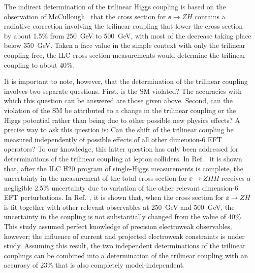The indirect determination of the trilinear Higgs coupling is based on
the observation of McCullough~\cite{McCullough:2013rea} that the cross
section for $\ee\to ZH$ contains a radiative correction involving the
trilinear coupling that lower the cross section by about 1.5\% from
250~GeV to 500~GeV, with most of the decrease taking place below
350~GeV.  Taken a face value in the simple context with only the
trilinear coupling free, the ILC cross section measurements would determine the trilinear 
coupling to about 40\%.

It is important to note, however, that the determination of the
trilinear coupling involves two separate questions.  First, is the SM
violated?   The accuracies with which this question can be answered
are those given above.  Second, can the violation of the SM be
attributed to a change in the trilinear coupling or the Higgs
potential rather than being due to other possible new physics
effects?  A precise way to ask this question is: Can the shift of the
trilinear coupling be measured  independently of possible effects of
all 
other dimension-6 EFT operators?   To our knowledge, this latter
question has only been addressed for determinations of the trilinear
coupling at lepton colliders.   In Ref.~\cite{Barklow:2017awn} it is
shown that, after the ILC H20 program of single-Higgs measurements is
complete, the uncertainty in the measurement of the total cross
section for  $\ee\to ZHH$ receives a negligible 2.5\% uncertainty due
to variation of the other relevant dimension-6 EFT perturbations.   In
Ref.~\cite{DiVita:2017vrr}, it is shown that, when the cross section
for $\ee\to ZH$ is fit together with other relevant observables at
250~GeV and 500~GeV, the
uncertainty in the coupling is not substantially changed from the value of
40\%.  This study assumed perfect knowledge of precision electroweak observables, however;
the influence of current and projected electroweak constraints is under study. Assuming this result, the two
independent determinations of the trilinear couplings can be combined
into a determination of the trilinear coupling  with an accuracy of 23\% that is
also completely model-independent.  


